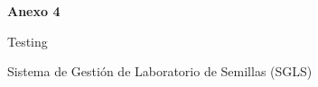 \clearpage
{}
\thispagestyle{empty}
\vspace*{3cm}
{\centering
{\Huge\bfseries Anexo 4\par}
\vspace{1cm}
{\LARGE Testing\par}
\vspace{2cm}
{\large Sistema de Gestión de Laboratorio de Semillas (SGLS)\par}
\vfill
\par}
\clearpage
